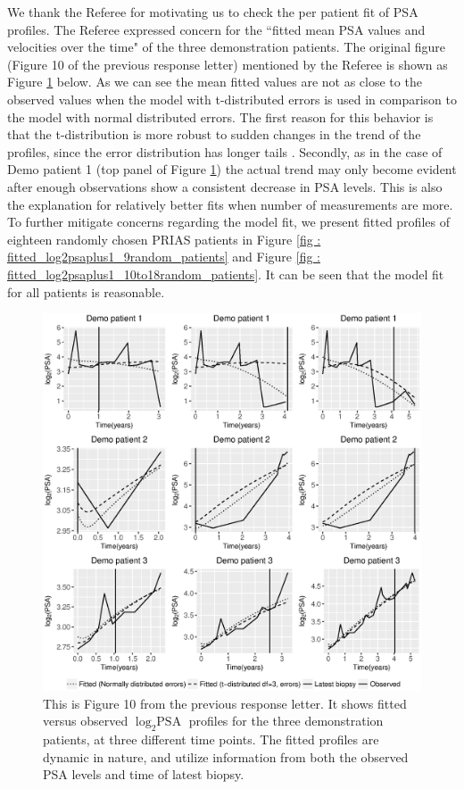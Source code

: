 \begin{enumerate}
        We thank the Referee for motivating us to check the per patient fit of PSA profiles. The Referee expressed concern for the ``fitted mean PSA values and velocities over the time" of the three demonstration patients. The original figure (Figure 10 of the previous response letter) mentioned by the Referee is shown as Figure \ref{fig : fitted_demo_patients_norm_t3} below. As we can see the mean fitted values are not as close to the observed values when the model with t-distributed errors is used in comparison to the model with normal distributed errors. The first reason for this behavior is that the t-distribution is more robust to sudden changes in the trend of the profiles, since the error distribution has longer tails \citep{lange1989robust}. Secondly, as in the case of Demo patient 1 (top panel of Figure \ref{fig : fitted_demo_patients_norm_t3}) the actual trend may only become evident after enough observations show a consistent decrease in PSA levels. This is also the explanation for relatively better fits when number of measurements are more. To further mitigate concerns regarding the model fit, we present fitted profiles of eighteen randomly chosen PRIAS patients in Figure \ref{fig : fitted_log2psaplus1_9random_patients} and Figure \ref{fig : fitted_log2psaplus1_10to18random_patients}. It can be seen that the model fit for all patients is reasonable.

        \clearpage
        \begin{figure}[!htb]
        \centerline{\includegraphics[width=\columnwidth]{../images/model_fit/fitted_demo_patients_norm_t3.eps}}
        \caption{This is Figure 10 from the previous response letter. It shows fitted versus observed $\log_2 \mbox{PSA}$ profiles for the three demonstration patients, at three different time points. The fitted profiles are dynamic in nature, and utilize information from both the observed PSA levels and time of latest biopsy.}
        \label{fig : fitted_demo_patients_norm_t3}
        \end{figure}
        \clearpage


\end{enumerate}
